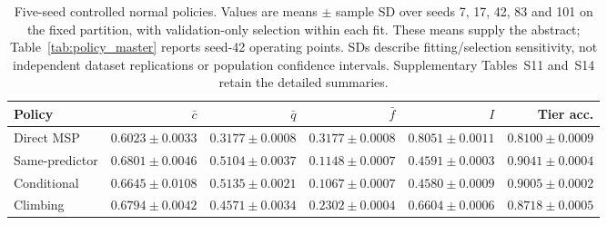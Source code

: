 \begin{table}[pos=htbp]
\centering\footnotesize
\setlength{\tabcolsep}{3.2pt}
\caption{Five-seed controlled normal policies. Values are means $\pm$ sample SD over seeds 7, 17, 42, 83 and 101 on the fixed partition, with validation-only selection within each fit. These means supply the abstract; Table~\ref{tab:policy_master} reports seed-42 operating points. SDs describe fitting/selection sensitivity, not independent dataset replications or population confidence intervals. Supplementary Tables~S11 and~S14 retain the detailed summaries.}\label{tab:seed_normal_main}
\begin{tabular}{lrrrrr}
\toprule
Policy & $\bar c$ & $\bar q$ & $\bar f$ & $I$ & Tier acc. \\
\midrule
Direct MSP & $0.6023\pm0.0033$ & $0.3177\pm0.0008$ & $0.3177\pm0.0008$ & $0.8051\pm0.0011$ & $0.8100\pm0.0009$ \\
Same-predictor & $0.6801\pm0.0046$ & $0.5104\pm0.0037$ & $0.1148\pm0.0007$ & $0.4591\pm0.0003$ & $0.9041\pm0.0004$ \\
Conditional & $0.6645\pm0.0108$ & $0.5135\pm0.0021$ & $0.1067\pm0.0007$ & $0.4580\pm0.0009$ & $0.9005\pm0.0002$ \\
Climbing & $0.6794\pm0.0042$ & $0.4571\pm0.0034$ & $0.2302\pm0.0004$ & $0.6604\pm0.0006$ & $0.8718\pm0.0005$ \\
\bottomrule
\end{tabular}
\end{table}
